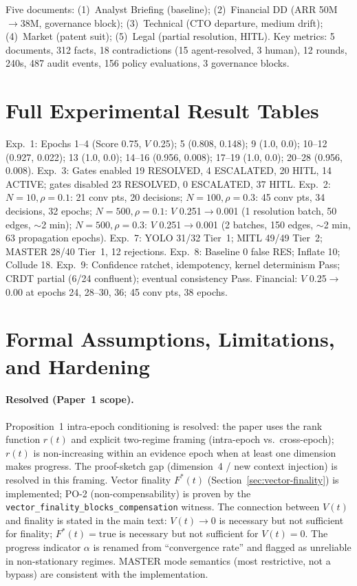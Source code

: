 \documentclass[11pt]{article}
\begin{document}
Five documents: (1)~Analyst Briefing (baseline); (2)~Financial DD (ARR 50M$\to$38M, governance block); (3)~Technical (CTO departure, medium drift); (4)~Market (patent suit); (5)~Legal (partial resolution, HITL). Key metrics: 5 documents, 312 facts, 18 contradictions (15 agent-resolved, 3 human), 12 rounds, 240s, 487 audit events, 156 policy evaluations, 3 governance blocks.

\section{Full Experimental Result Tables}
\label{sec:app-results}

Exp.~1: Epochs 1--4 (Score 0.75, $V$ 0.25); 5 (0.808, 0.148); 9 (1.0, 0.0); 10--12 (0.927, 0.022); 13 (1.0, 0.0); 14--16 (0.956, 0.008); 17--19 (1.0, 0.0); 20--28 (0.956, 0.008). Exp.~3: Gates enabled 19 RESOLVED, 4 ESCALATED, 20 HITL, 14 ACTIVE; gates disabled 23 RESOLVED, 0 ESCALATED, 37 HITL. Exp.~2: $N=10,\rho=0.1$: 21 conv pts, 20 decisions; $N=100,\rho=0.3$: 45 conv pts, 34 decisions, 32 epochs; $N=500,\rho=0.1$: $V$ 0.251$\to$0.001 (1 resolution batch, 50 edges, $\sim$2 min); $N=500,\rho=0.3$: $V$ 0.251$\to$0.001 (2 batches, 150 edges, $\sim$2 min, 63 propagation epochs). Exp.~7: YOLO 31/32 Tier~1; MITL 49/49 Tier~2; MASTER 28/40 Tier~1, 12 rejections. Exp.~8: Baseline 0 false RES; Inflate 10; Collude 18. Exp.~9: Confidence ratchet, idempotency, kernel determinism Pass; CRDT partial (6/24 confluent); eventual consistency Pass. Financial: $V$ 0.25$\to$0.00 at epochs 24, 28--30, 36; 45 conv pts, 38 epochs.

\section{Formal Assumptions, Limitations, and Hardening}
\label{sec:app-assumptions}
\label{sec:formal-hardening}

\paragraph{Resolved (Paper~1 scope).} Proposition~1 intra-epoch conditioning is resolved: the paper uses the rank function $r(t)$ and explicit two-regime framing (intra-epoch vs.\ cross-epoch); $r(t)$ is non-increasing within an evidence epoch when at least one dimension makes progress. The proof-sketch gap (dimension~4 / new context injection) is resolved in this framing. Vector finality $F^*(t)$ (Section~\ref{sec:vector-finality}) is implemented; PO-2 (non-compensability) is proven by the \texttt{vector\_finality\_blocks\_compensation} witness. The connection between $V(t)$ and finality is stated in the main text: $V(t) \to 0$ is necessary but not sufficient for finality; $F^*(t) = \mathrm{true}$ is necessary but not sufficient for $V(t) = 0$. The progress indicator $\alpha$ is renamed from ``convergence rate'' and flagged as unreliable in non-stationary regimes. MASTER mode semantics (most restrictive, not a bypass) are consistent with the implementation.
\end{document}
